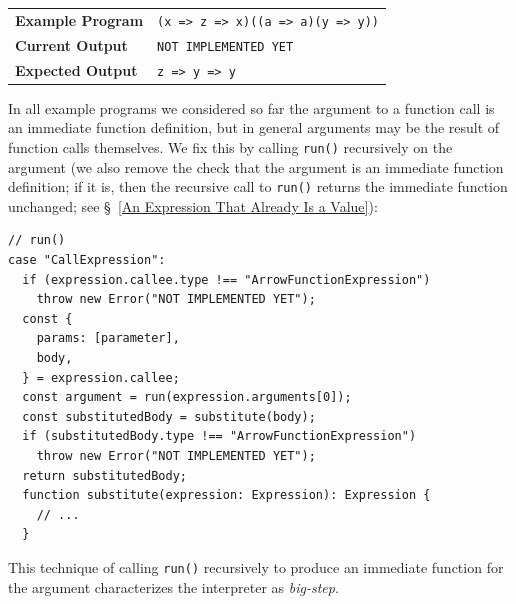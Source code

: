 \documentclass[12pt, oneside]{book}
\begin{document}
\begin{center}
\begin{tabular}{ll}
\textbf{Example Program} & \texttt{(x => z => x)((a => a)(y => y))} \\
\textbf{Current Output} & \texttt{NOT IMPLEMENTED YET} \\
\textbf{Expected Output} & \texttt{z => y => y} \\
\end{tabular}
\end{center}

In all example programs we considered so far the argument to a function call is an immediate function definition, but in general arguments may be the result of function calls themselves. We fix this by calling \texttt{run()} recursively on the argument (we also remove the check that the argument is an immediate function definition; if it is, then the recursive call to \texttt{run()} returns the immediate function unchanged; see §~\ref{An Expression That Already Is a Value}):

\begin{verbatim}
// run()
case "CallExpression":
  if (expression.callee.type !== "ArrowFunctionExpression")
    throw new Error("NOT IMPLEMENTED YET");
  const {
    params: [parameter],
    body,
  } = expression.callee;
  const argument = run(expression.arguments[0]);
  const substitutedBody = substitute(body);
  if (substitutedBody.type !== "ArrowFunctionExpression")
    throw new Error("NOT IMPLEMENTED YET");
  return substitutedBody;
  function substitute(expression: Expression): Expression {
    // ...
  }
\end{verbatim}

\begin{mdframed}[frametitle = {Technical Terms}]
This technique of calling \texttt{run()} recursively to produce an immediate function for the argument characterizes the interpreter as \emph{big-step}.
\end{mdframed}
\end{document}
